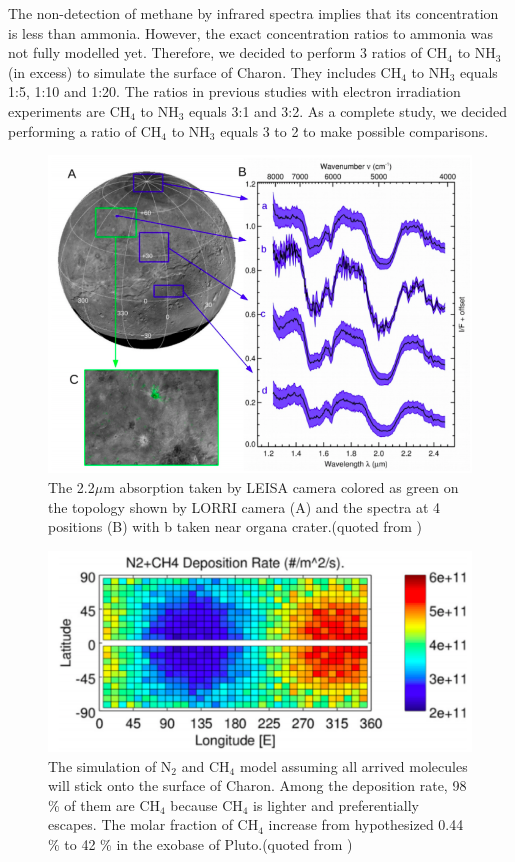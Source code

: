 The non-detection of methane by infrared spectra implies that its concentration is less than ammonia. However, the exact concentration ratios to ammonia was not fully modelled yet. Therefore, we decided to perform 3 ratios of CH$_4$ to NH$_3$ (in excess) to simulate the surface of Charon. They includes CH$_4$ to NH$_3$ equals 1:5, 1:10 and 1:20. The ratios in previous studies with electron irradiation experiments are CH$_4$ to NH$_3$ equals 3:1\cite{kim} and 3:2\cite{kundu2017electron}. As a complete study, we decided performing a ratio of CH$_4$ to NH$_3$ equals 3 to 2 to make possible comparisons.\\

\begin{figure}
\centering
\includegraphics[width=\textwidth]{figures/chapter1/IR.png}
\caption{The 2.2$\mu$m absorption taken by LEISA camera colored as green on the topology shown by LORRI camera (A) and the spectra at 4 positions (B) with b taken near organa crater.(quoted from \cite{grundy2016surface})}
\label{fig:Charon_IR}
\end{figure}

\begin{figure}
\centering
\includegraphics[width=\textwidth]{figures/chapter1/methane.png}
\caption{The simulation of N$_2$ and CH$_4$ model assuming all arrived molecules will stick onto the surface of Charon. Among the deposition rate, 98 \% of them are CH$_4$ because CH$_4$ is lighter and preferentially escapes. The molar fraction of CH$_4$ increase from hypothesized 0.44 \% to 42 \% in the exobase of Pluto.(quoted from \cite{hoey2017rarefied})}
\label{fig:Charon_distribution}
\end{figure}


